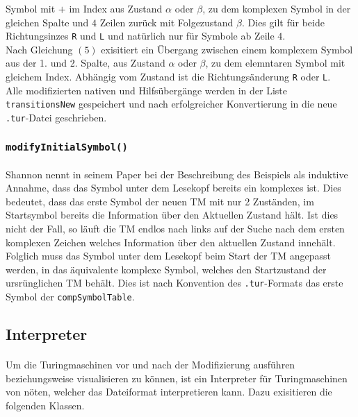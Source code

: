 \documentclass[10pt, a4paper]{article}
\newcommand{\ilc}{\texttt}
\begin{document}
Symbol mit $+$ im Index aus Zustand $\alpha$ oder $\beta$, zu dem komplexen
Symbol in der gleichen Spalte und $4$ Zeilen zurück mit Folgezustand $\beta$.
Dies gilt für beide Richtungsinzes \ilc{R} und \ilc{L} und natürlich nur für Symbole ab Zeile $4$.\\
Nach Gleichung $(5)$ exisitiert ein Übergang zwischen einem komplexem
Symbol aus der 1. und 2. Spalte, aus Zustand $\alpha$ oder $\beta$, zu dem
elemntaren Symbol mit gleichem Index. Abhängig vom Zustand ist die
Richtungsänderung \ilc{R} oder \ilc{L}.\\
Alle modifizierten nativen und Hilfsübergänge werden in der Liste \ilc{transitionsNew} gespeichert und nach erfolgreicher Konvertierung in die neue \ilc{.tur}-Datei geschrieben.\par

\subsubsection*{\ilc{modifyInitialSymbol()}}
\paragraph*{}
Shannon nennt in seinem Paper bei der Beschreibung des Beispiels als induktive Annahme, dass das Symbol unter dem Lesekopf bereits ein komplexes ist. Dies bedeutet, dass das erste Symbol der neuen TM mit nur 2 Zuständen, im Startsymbol bereits die Information über den Aktuellen Zustand hält. Ist dies nicht der Fall, so läuft die TM endlos nach links auf der Suche nach dem ersten komplexen Zeichen welches Information über den aktuellen Zustand innehält.\\
Folglich muss das Symbol unter dem Lesekopf beim Start der TM angepasst werden, in das äquivalente komplexe Symbol, welches den Startzustand der ursrünglichen TM behält. Dies ist nach Konvention des \ilc{.tur}-Formats das erste Symbol der \ilc{compSymbolTable}.\par

\subsection*{Interpreter}
\paragraph*{}
Um die Turingmaschinen vor und nach der Modifizierung ausführen beziehungsweise visualisieren zu können, ist ein Interpreter für Turingmaschinen von nöten, welcher das Dateiformat interpretieren kann. Dazu exisitieren die folgenden Klassen.\par
\end{document}

